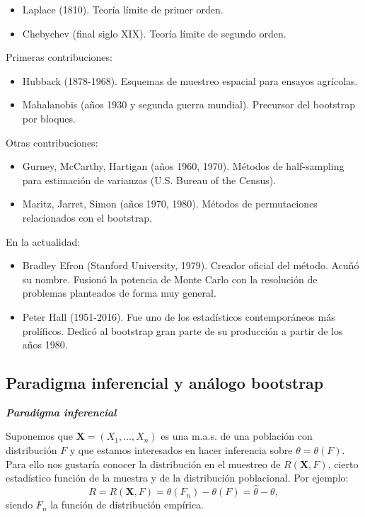 \documentclass[
]{book}
\renewcommand{\mathbf}[1]{\symbf{#1}}
\theoremstyle{break}
\theoremstyle{nonumberplain}
\begin{document}
\begin{itemize}
\item
  Laplace (1810). Teoría límite de primer orden.
\item
  Chebychev (final siglo XIX). Teoría límite de segundo orden.
\end{itemize}

Primeras contribuciones:

\begin{itemize}
\item
  Hubback (1878-1968). Esquemas de muestreo espacial para ensayos
  agrícolas.
\item
  Mahalanobis (años 1930 y segunda guerra mundial). Precursor del
  bootstrap por bloques.
\end{itemize}

Otras contribuciones:

\begin{itemize}
\item
  Gurney, McCarthy, Hartigan (años 1960, 1970). Métodos de
  half-sampling para estimación de varianzas (U.S. Bureau of the
  Census).
\item
  Maritz, Jarret, Simon (años 1970, 1980). Métodos de permutaciones
  relacionados con el bootstrap.
\end{itemize}

En la actualidad:

\begin{itemize}
\item
  Bradley Efron (Stanford University, 1979). Creador oficial del
  método. Acuñó su nombre. Fusionó la potencia de Monte Carlo con la
  resolución de problemas planteados de forma muy general.
\item
  Peter Hall (1951-2016). Fue uno de los estadísticos contemporáneos
  más prolíficos. Dedicó al bootstrap gran parte de su producción a
  partir de los años 1980.
\end{itemize}

\subsection{Paradigma inferencial y análogo bootstrap}\label{paradigma-inferencial-y-anuxe1logo-bootstrap}

\textbf{\emph{Paradigma inferencial}}

Suponemos que \(\mathbf{X}=\left( X_1,\ldots ,X_n \right)\) es una m.a.s.
de una población con distribución \(F\) y que
estamos interesados en hacer inferencia sobre \(\theta =\theta \left(F \right)\).
Para ello nos gustaría conocer la distribución en el muestreo de
\(R\left( \mathbf{X},F \right)\), cierto estadístico función
de la muestra y de la distribución poblacional.
Por ejemplo:
\[R=R\left( \mathbf{X},F \right) =\theta \left( F_n \right) 
-\theta \left( F \right) = \hat \theta - \theta,\]
siendo \(F_n\) la función de distribución empírica.
\end{document}
